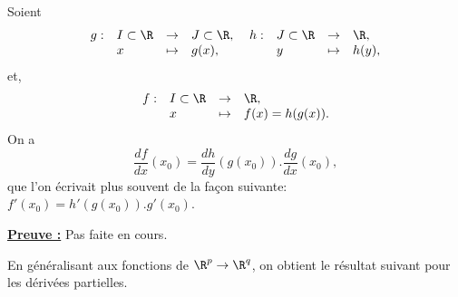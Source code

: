 \documentclass[class=report,crop=false]{standalone}
\begin{document}
 \begin{proposition}
\textcolor[rgb]{0.50,0.00,0.25}{
Soient 
\begin{equation*}
\begin{array}{llll}
g:& I  \subset \R &\rightarrow & J \subset \R, \\
 & x & \mapsto & g(x),
\end{array}
\;
\begin{array}{llll}
h:& J  \subset \R &\rightarrow &  \R, \\
 & y & \mapsto & h(y),
\end{array}
\end{equation*}
et, 
\begin{equation*}
\begin{array}{llll}
f:& I  \subset \R &\rightarrow &  \R, \\
 & x & \mapsto & f(x)=h(g(x)).
\end{array}
\end{equation*}
On a
\begin{equation*}
\dfrac{df}{dx}(x_0)=\dfrac{dh}{dy}(g(x_0)).\dfrac{dg}{dx}(x_0),
\end{equation*}
que l'on écrivait plus souvent de la façon suivante: $f'(x_0)=h'(g(x_0)).g'(x_0)$.
}
\end{proposition}


\noindent \underline{\bf Preuve :}
Pas faite en cours.



\noindent En généralisant aux fonctions de $\R^p \rightarrow \R^q$, on obtient le résultat
suivant pour les dérivées partielles.
\end{document}
